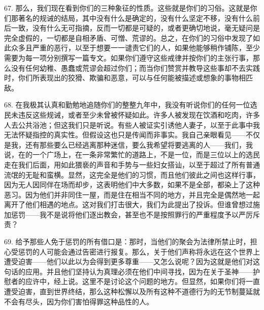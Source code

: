67. 那么，我们现在看到你们的三种象征的性质。这些就是你们的习俗。这就是你们那著名的规诫的结局，其中没有什么是确定的，没有什么坚定不移，没有什么前后一致，没有什么无可指摘，反而一切都是可疑的，或者更确切地说，毫无疑问是完全虚假的，一切都是自相矛盾、可憎、荒谬的。\newline{}总之，在你们的习俗中发现了如此众多且严重的恶行，以至于想要一一谴责它们的人，如果他能够稍作铺陈，至少需要为每一项分别撰写一篇专文。\newline{}如果你们遵守这些戒律并按你们的主张行事，那么没有任何幼稚、愚蠢或荒谬会超过你们；而当你们赞赏并教导这些事却不去实践时，你们所表现出的狡猾、欺骗和恶意，可以与任何能被描述或想象的事物相匹敌。\par

68. 在我极其认真和勤勉地追随你们的整整九年中，我没有听说你们的任何一位选民未违反这些规诫，或者至少未曾被怀疑如此。\newline{}许多人被发现在饮酒和吃肉，许多人去公共浴池；但这我们只是听说。\newline{}有些人被证实引诱他人妻子，以至于此事中我无法怀疑指控的真实性。\newline{}但假设这也只是传闻而非事实。\newline{}我自己亲眼看见——不仅是我，还有那些要么已经逃离那种迷信，要么我希望将要逃离的人——我们，我说，在的一个广场上，在一条非常繁忙的道路上，不是一位，而是三位以上的选民走在我们后面，用如此猥亵的声音和手势与一些妇女搭讪，以至于超过了所有普通流氓的无耻和蛮横。\newline{}显然，这完全是他们的习惯，而且他们彼此之间也这样行事，因为无人因同伴在场而却步，这表明他们中大多数，如果不是全部，都染上了这种恶习。\newline{}因为他们并非同住一屋，而是住在相当不同的地方，并且完全是偶然地一起离开了他们相遇的地点。\newline{}这对我们打击很大，我们为此提出了投诉。\newline{}但谁曾想过施加惩罚——我不是说将他们逐出教会，甚至也不是按照罪行的严重程度予以严厉斥责？\par

69. 给予那些人免于惩罚的所有借口是：那时，当他们的聚会为法律所禁止时，担心受惩罚的人可能会通过告密进行报复。\newline{}那么，关于他们声称将永远在这个世界上遭受迫害——他们以此以为会得到更多尊重——又怎么说呢？\newline{}因为这就是他们对这句话的应用。\newline{}并且他们坚持认为真理必须在他们中间寻找，因为在关于圣神——护慰者的应许中，经上说。\newline{}这里不是讨论这个问题的地方。\newline{}但显然，如果你们将一直遭受迫害，直到世界终结，那么这种松懈以及所有这种不道德行为的无节制蔓延就不会有尽头，因为你们害怕得罪这种品性的人。\par


